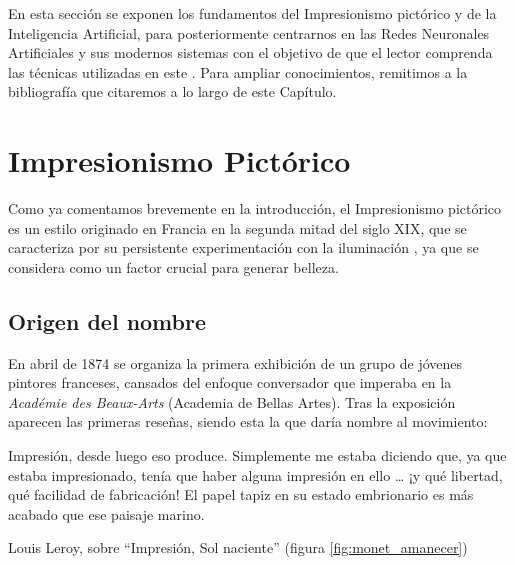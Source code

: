 \documentclass[../main.tex]{subfiles}
\begin{document}
En esta sección se exponen los fundamentos del Impresionismo pictórico y de la Inteligencia Artificial, para posteriormente centrarnos en las Redes Neuronales Artificiales y sus modernos sistemas con el objetivo de que el lector comprenda las técnicas utilizadas en este \tfg. Para ampliar conocimientos, remitimos a la bibliografía que citaremos a lo largo de este Capítulo.

\section{Impresionismo Pictórico}
Como ya comentamos brevemente en la introducción, el Impresionismo pictórico es un estilo originado en Francia en la segunda mitad del siglo XIX, que se caracteriza por su persistente experimentación con la iluminación \cite{Todocuadros}, ya que se considera como un factor crucial para generar belleza.

\subsection{Origen del nombre}

En abril de 1874 se organiza la primera exhibición de un grupo de jóvenes pintores franceses, cansados del enfoque conversador que imperaba en la \textit{Académie des Beaux-Arts} (Academia de Bellas Artes). Tras la exposición aparecen las primeras reseñas, siendo esta la que daría nombre al movimiento:
\begin{center}
    \begin{minipage}{0.9\linewidth}
        \vspace{5pt}%
        {\small
            Impresión, desde luego eso produce. Simplemente me estaba diciendo que, ya que estaba impresionado, tenía que haber alguna impresión en ello … ¡y qué libertad, qué facilidad de fabricación! El papel tapiz en su estado embrionario es más acabado que ese paisaje marino.
        }
        \begin{flushright}
            Louis Leroy, sobre “Impresión, Sol naciente” (figura \ref{fig:monet_amanecer}) \cite{Sienra2019}
        \end{flushright}
        \vspace{3pt}%
    \end{minipage}
\end{center}
\end{document}
